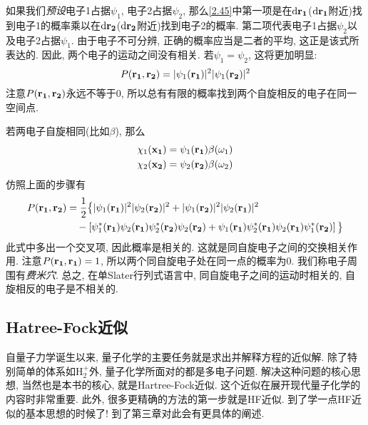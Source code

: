 如果我们\emph{预设}电子1占据$\psi_1$, 电子2占据$\psi_2$, 那么\ref{2.45}中第一项是在$\db{r_1}$($\db{r_1}$附近)找到电子1的概率乘以在$\db{r_2}$($\db{r_2}$附近)找到电子2的概率. 第二项代表电子1占据$\psi_2$以及电子2占据$\psi_1$. 由于电子不可分辨, 正确的概率应当是二者的平均, 这正是该式所表达的. 因此, 两个电子的运动之间没有相关. 若$\psi_1=\psi_2$, 这将更加明显:
\begin{equation}
P(\mathbf{r_1,r_2})=|\psi_1(\mathbf{r_1})|^2|\psi_1(\mathbf{r_2})|^2
\end{equation}
注意$P(\mathbf{r_1,r_2})$永远不等于0, 所以总有有限的概率找到两个自旋相反的电子在同一空间点.

若两电子自旋相同(比如$\beta$), 那么
\begin{align}
\chi_1(\mathbf{x_1})=\psi_1(\mathbf{r_1})\beta(\omega_1)\\
\chi_2(\mathbf{x_2})=\psi_2(\mathbf{r_2})\beta(\omega_2)
\end{align}
仿照上面的步骤有
\begin{align}
P(\mathbf{r_1,r_2})&=\frac{1}{2}\big\{|\psi_1(\mathbf{r_1})|^2|\psi_2(\mathbf{r_2})|^2+|\psi_1(\mathbf{r_2})|^2|\psi_2(\mathbf{r_1})|^2\notag\\
&\quad - \left[\psi^*_1(\mathbf{r_1})\psi_2(\mathbf{r_1}) \psi^*_2(\mathbf{r_2})\psi_2(\mathbf{r_2}) + \psi_1(\mathbf{r_1})\psi_2^*(\mathbf{r_1})\psi_2(\mathbf{r_1})\psi_1^*(\mathbf{r_2})\right]\big\}
\end{align}
此式中多出一个交叉项, 因此概率是相关的. 这就是同自旋电子之间的交换相关作用. 注意$P(\mathbf{r_1,r_1})=1$, 所以两个同自旋电子处在同一点的概率为0. 我们称电子周围有\emph{费米穴}. 总之, 在单Slater行列式语言中, 同自旋电子之间的运动时相关的, 自旋相反的电子是不相关的.

\subsection{Hatree-Fock近似}
 \label{sec2.2.4}
自量子力学诞生以来, 量子化学的主要任务就是求出并解释\sch 方程的近似解. 除了特别简单的体系如$\text{H}^+_2$外, 量子化学所面对的都是多电子问题. 解决这种问题的核心思想, 当然也是本书的核心, 就是Hartree-Fock近似. 这个近似在展开现代量子化学的内容时非常重要. 此外, 很多更精确的方法的第一步就是HF近似. 到了学一点HF近似的基本思想的时候了! 到了第三章对此会有更具体的阐述.

